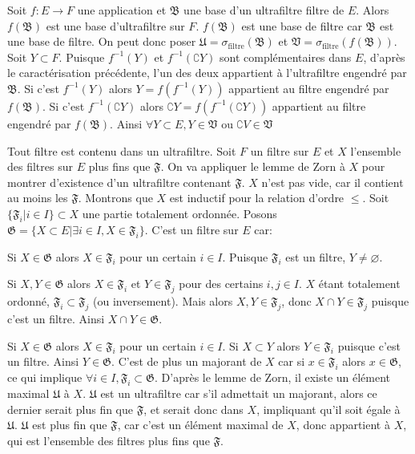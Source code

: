 \documentclass[a4paper, 11pt, french]{book}
\newenvironment{itemise}{\itemize}{\enditemize}
\theoremstyle{plain} %
\theoremstyle{definition} %
\theoremstyle{remark} %
\newcommand{\1}{\mathds{1}}
\newcommand\vide{\varnothing}
\newcommand{\infegal}{\leqslant}
\newcommand{\inv}[1]{#1^{-1}}
\newcommand\ou{\text{ ou }}
\begin{document}
\proposition
Soit $f:E\rightarrow F$ une application et $\mathfrak{B}$ une base d'un ultrafiltre filtre de $E$.
Alors $f(\mathfrak{B})$ est une base d'ultrafiltre sur $F$.
\demonstration
$f(\mathfrak{B})$ est une base de filtre car $\mathfrak{B}$ est une base de filtre.
On peut donc poser $\mathfrak{U}=\sigma_\text{filtre}(\mathfrak{B})$ et $\mathfrak{V}=\sigma_\text{filtre}(f(\mathfrak{B}))$.
Soit $Y\subset F$.
Puisque $\inv{f}(Y)$ et $\inv{f}(\complement Y)$ sont complémentaires dans $E$, d'après le caractérisation précédente, l'un des deux appartient à l'ultrafiltre engendré par $\mathfrak{B}$.
Si c'est $\inv{f}(Y)$ alors $Y=f(\inv{f}(Y))$ appartient au filtre engendré par $f(\mathfrak{B})$.
Si c'est $\inv{f}(\complement Y)$ alors $\complement Y=f(\inv{f}(\complement Y))$ appartient au filtre engendré par $f(\mathfrak{B})$.
Ainsi $\forall Y\subset E, Y\in\mathfrak{V}\ou\complement V\in\mathfrak{V}$

\proposition
Tout filtre est contenu dans un ultrafiltre.
\demonstration
Soit $F$ un filtre sur $E$ et $X$ l'ensemble des filtres sur $E$ plus fins que $\mathfrak{F}$.
On va appliquer le lemme de Zorn à $X$ pour montrer d'existence d'un ultrafiltre contenant $\mathfrak{F}$.
$X$ n'est pas vide, car il contient au moins les $\mathfrak{F}$.
Montrons que $X$ est inductif pour la relation d'ordre $\infegal$.
Soit $\{\mathfrak{F}_i | i\in I\}\subset X$ une partie totalement ordonnée.
Posons $\mathfrak{G}=\{X\subset E | \exists i\in I, X\in\mathfrak{F}_i\}$.
C'est un filtre sur $E$ car:
\begin{itemise}
	\item Si $X\in\mathfrak{G}$ alors $X\in\mathfrak{F}_i$ pour un certain $i\in I$.
	Puisque $\mathfrak{F}_i$ est un filtre, $Y\neq\vide$.
	\item Si $X, Y\in\mathfrak{G}$ alors $X\in\mathfrak{F}_i$ et $Y\in\mathfrak{F}_j$ pour des certains $i, j\in I$.
	$X$ étant totalement ordonné, $\mathfrak{F}_i\subset\mathfrak{F}_j$ (ou inversement).
	Mais alors $X, Y\in\mathfrak{F}_j$, donc $X\cap Y\in\mathfrak{F}_j$ puisque c'est un filtre.
	Ainsi $X\cap Y\in\mathfrak{G}$.
	\item Si $X\in\mathfrak{G}$ alors $X\in\mathfrak{F}_i$ pour un certain $i\in I$.
	Si $X\subset Y$ alors $Y\in\mathfrak{F}_i$ puisque c'est un filtre.
	Ainsi $Y\in\mathfrak{G}$.
\end{itemise}
C'est de plus un majorant de $X$ car si $x\in\mathfrak{F}_i$ alors $x\in\mathfrak{G}$, ce qui implique $\forall i\in I, \mathfrak{F}_i\subset\mathfrak{G}$.
D'après le lemme de Zorn, il existe un élément maximal $\mathfrak{U}$ à $X$.
$\mathfrak{U}$ est un ultrafiltre car s'il admettait un majorant, alors ce dernier serait plus fin que $\mathfrak{F}$, et serait donc dans $X$, impliquant qu'il soit égale à $\mathfrak{U}$.
$\mathfrak{U}$ est plus fin que $\mathfrak{F}$, car c'est un élément maximal de $X$, donc appartient à $X$, qui est l'ensemble des filtres plus fins que $\mathfrak{F}$.
\end{document}
